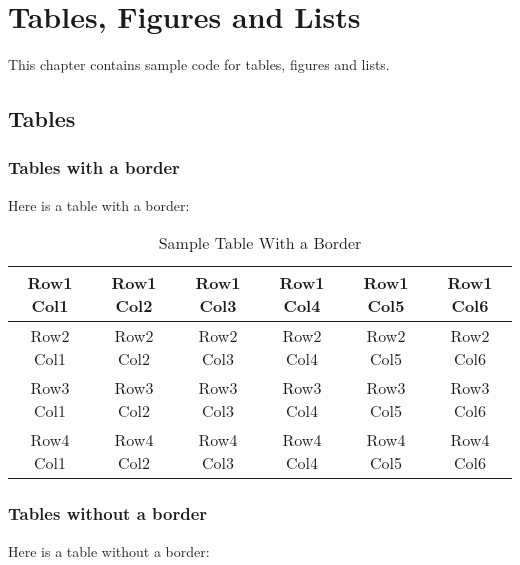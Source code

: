 \documentclass[12pt]{MUNThesisBibTeX}
\begin{document}
\chapter{Tables, Figures and Lists}

This chapter contains sample code for tables, figures and lists.

\section{Tables}
\subsection{Tables with a border}
Here is a table with a border:

\begin{table}[ht]
\caption{Sample Table With a Border}
\label{TableBorder}
\begin{center} %


\begin{tabular}{| c | c | c | c | c | c |}


\hline


Row1 Col1 &Row1 Col2 &Row1 Col3 &Row1 Col4 &Row1 Col5 &Row1 Col6 \\
\hline
Row2 Col1 &Row2 Col2 &Row2 Col3 &Row2 Col4 &Row2 Col5 &Row2 Col6 \\
\hline
Row3 Col1 &Row3 Col2 &Row3 Col3 &Row3 Col4 &Row3 Col5 &Row3 Col6 \\
\hline
Row4 Col1 &Row4 Col2 &Row4 Col3 &Row4 Col4 &Row4 Col5 &Row4 Col6 \\
\hline

\end{tabular}
\end{center}
\end{table}

\subsection{Tables without a border}
Here is a table without a border:
\end{document}
